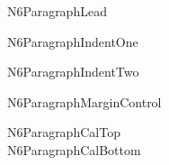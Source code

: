 \documentclass{abntexto-ufc}
\begin{document}
\textual

N6ParagraphLead

N6ParagraphIndentOne

N6ParagraphIndentTwo

\vspace{4\baselineskip}
\noindent N6ParagraphMarginControl

\vspace{2\baselineskip}
\noindent N6ParagraphCalTop\\
N6ParagraphCalBottom
\end{document}
